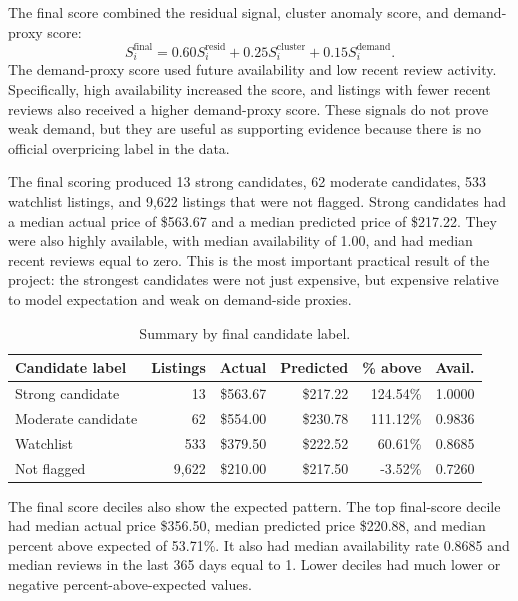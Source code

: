 \documentclass[11pt]{article}
\begin{document}
The final score combined the residual signal, cluster anomaly score, and demand-proxy score:
\[
S^{\text{final}}_i
=0.60S^{\text{resid}}_i
+0.25S^{\text{cluster}}_i
+0.15S^{\text{demand}}_i.
\]
The demand-proxy score used future availability and low recent review activity. Specifically, high availability increased the score, and listings with fewer recent reviews also received a higher demand-proxy score. These signals do not prove weak demand, but they are useful as supporting evidence because there is no official overpricing label in the data.

The final scoring produced 13 strong candidates, 62 moderate candidates, 533 watchlist listings, and 9,622 listings that were not flagged. Strong candidates had a median actual price of \$563.67 and a median predicted price of \$217.22. They were also highly available, with median availability of 1.00, and had median recent reviews equal to zero. This is the most important practical result of the project: the strongest candidates were not just expensive, but expensive relative to model expectation and weak on demand-side proxies.

\begin{table}[H]
\centering
\caption{Summary by final candidate label.}
\small
\begin{tabular}{L{0.24\textwidth}rrrrr}
\toprule
Candidate label & Listings & Actual & Predicted & \% above & Avail. \\
\midrule
Strong candidate & 13 & \$563.67 & \$217.22 & 124.54\% & 1.0000 \\
Moderate candidate & 62 & \$554.00 & \$230.78 & 111.12\% & 0.9836 \\
Watchlist & 533 & \$379.50 & \$222.52 & 60.61\% & 0.8685 \\
Not flagged & 9,622 & \$210.00 & \$217.50 & -3.52\% & 0.7260 \\
\bottomrule
\end{tabular}
\end{table}

The final score deciles also show the expected pattern. The top final-score decile had median actual price \$356.50, median predicted price \$220.88, and median percent above expected of 53.71\%. It also had median availability rate 0.8685 and median reviews in the last 365 days equal to 1. Lower deciles had much lower or negative percent-above-expected values.
\end{document}
